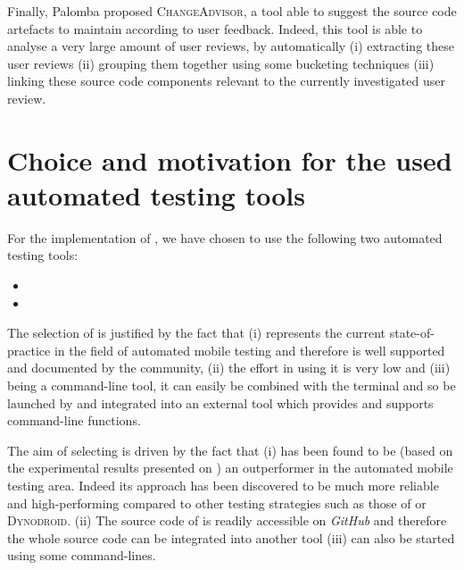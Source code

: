 Finally, Palomba \etal \cite{Palomba2017} proposed \textsc{ChangeAdvisor}, a tool able to suggest the source code artefacts to maintain according to user feedback.
Indeed, this tool is able to analyse a very large amount of user reviews, by automatically (i) extracting these user reviews (ii) grouping them together using some bucketing techniques (iii) linking these source code components relevant to the currently investigated user review.




\section{Choice and motivation for the used automated testing tools}
\label{sec:choicetool}
For the implementation of \toolname, we have chosen to use the following two automated testing tools: 
\begin{itemize}
\item \monkey
\item \sapienz
\end{itemize}
The selection of \monkey is justified by the fact that (i) \monkey represents the current state-of-practice in the field of automated mobile testing \cite{evodroid} and therefore is well supported and documented by the community, (ii) the effort in using it is very low \cite{areWeThereYet}  and (iii) being a command-line tool, it can easily be combined with the terminal and so be launched by and integrated into an external tool which provides and supports command-line functions.  

The aim of selecting \sapienz is driven by the fact that (i) \sapienz has been found to be (based on the experimental results presented on \cite{sapienz}) an outperformer in the automated mobile testing area. Indeed its approach has been discovered to be much more reliable and high-performing compared to other testing strategies such as those of \monkey or \textsc{Dynodroid}. (ii) The source code of \sapienz is readily accessible on \textit{GitHub} and therefore the whole source code can be integrated into another tool (iii) \sapienz can also be started using some command-lines. 










